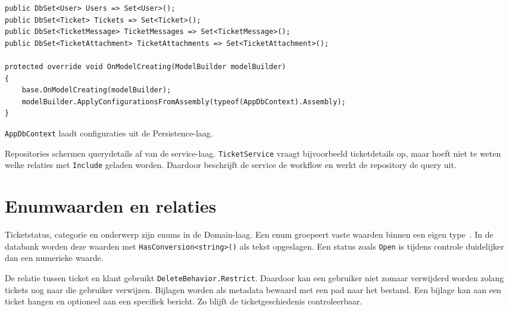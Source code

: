 \begin{listing}[H]
\begin{verbatim}
public DbSet<User> Users => Set<User>();
public DbSet<Ticket> Tickets => Set<Ticket>();
public DbSet<TicketMessage> TicketMessages => Set<TicketMessage>();
public DbSet<TicketAttachment> TicketAttachments => Set<TicketAttachment>();

protected override void OnModelCreating(ModelBuilder modelBuilder)
{
    base.OnModelCreating(modelBuilder);
    modelBuilder.ApplyConfigurationsFromAssembly(typeof(AppDbContext).Assembly);
}
\end{verbatim}
\caption[DbContext met configuraties]{\texttt{AppDbContext} laadt configuraties uit de Persistence-laag.}
\label{lst:appdbcontext}
\end{listing}

Repositories schermen querydetails af van de service-laag. \texttt{TicketService} vraagt bijvoorbeeld ticketdetails op, maar hoeft niet te weten welke relaties met \texttt{Include} geladen worden. Daardoor beschrijft de service de workflow en werkt de repository de query uit.

\section{Enumwaarden en relaties}

Ticketstatus, categorie en onderwerp zijn enums in de Domain-laag. Een enum groepeert vaste waarden binnen een eigen type~\autocite{MicrosoftCSharpEnums2026}. In de databank worden deze waarden met \texttt{HasConversion<string>()} als tekst opgeslagen. Een status zoals \texttt{Open} is tijdens controle duidelijker dan een numerieke waarde.

De relatie tussen ticket en klant gebruikt \texttt{DeleteBehavior.Restrict}. Daardoor kan een gebruiker niet zomaar verwijderd worden zolang tickets nog naar die gebruiker verwijzen. Bijlagen worden als metadata bewaard met een pad naar het bestand. Een bijlage kan aan een ticket hangen en optioneel aan een specifiek bericht. Zo blijft de ticketgeschiedenis controleerbaar.
